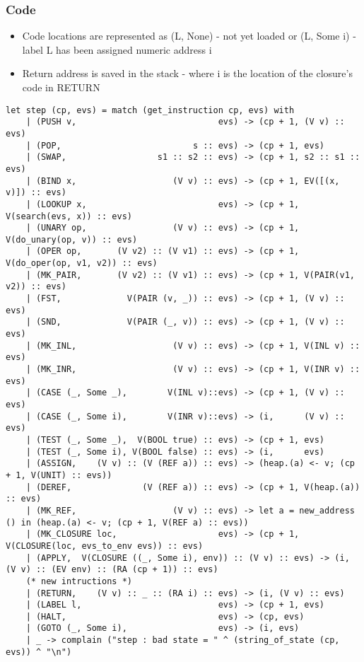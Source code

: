 \documentclass{article}
\begin{document}
\subsubsection{Code}
\begin{itemize}
	\item Code locations are represented as (L, None) - not yet loaded or (L, Some i) - label L has been assigned numeric address i
	\item Return address is saved in the stack - where i is the location of the closure's code in RETURN
\end{itemize}
\begin{lstlisting}
let step (cp, evs) = match (get_instruction cp, evs) with 
	| (PUSH v,                            evs) -> (cp + 1, (V v) :: evs)
	| (POP,                          s :: evs) -> (cp + 1, evs) 
	| (SWAP,                  s1 :: s2 :: evs) -> (cp + 1, s2 :: s1 :: evs) 
	| (BIND x,                   (V v) :: evs) -> (cp + 1, EV([(x, v)]) :: evs) 
	| (LOOKUP x,                          evs) -> (cp + 1, V(search(evs, x)) :: evs)
	| (UNARY op,                 (V v) :: evs) -> (cp + 1, V(do_unary(op, v)) :: evs) 
	| (OPER op,       (V v2) :: (V v1) :: evs) -> (cp + 1, V(do_oper(op, v1, v2)) :: evs)
	| (MK_PAIR,       (V v2) :: (V v1) :: evs) -> (cp + 1, V(PAIR(v1, v2)) :: evs)
	| (FST,             V(PAIR (v, _)) :: evs) -> (cp + 1, (V v) :: evs)
	| (SND,             V(PAIR (_, v)) :: evs) -> (cp + 1, (V v) :: evs)
	| (MK_INL,                   (V v) :: evs) -> (cp + 1, V(INL v) :: evs)
	| (MK_INR,                   (V v) :: evs) -> (cp + 1, V(INR v) :: evs)
	| (CASE (_, Some _),        V(INL v)::evs) -> (cp + 1, (V v) :: evs) 
	| (CASE (_, Some i),        V(INR v)::evs) -> (i,      (V v) :: evs) 
	| (TEST (_, Some _),  V(BOOL true) :: evs) -> (cp + 1, evs) 
	| (TEST (_, Some i), V(BOOL false) :: evs) -> (i,      evs) 
	| (ASSIGN,    (V v) :: (V (REF a)) :: evs) -> (heap.(a) <- v; (cp + 1, V(UNIT) :: evs))
	| (DEREF,              (V (REF a)) :: evs) -> (cp + 1, V(heap.(a)) :: evs)
	| (MK_REF,                   (V v) :: evs) -> let a = new_address () in (heap.(a) <- v; (cp + 1, V(REF a) :: evs))
	| (MK_CLOSURE loc,                    evs) -> (cp + 1, V(CLOSURE(loc, evs_to_env evs)) :: evs)
	| (APPLY,  V(CLOSURE ((_, Some i), env)) :: (V v) :: evs) -> (i, (V v) :: (EV env) :: (RA (cp + 1)) :: evs)
	(* new intructions *) 
	| (RETURN,    (V v) :: _ :: (RA i) :: evs) -> (i, (V v) :: evs) 
	| (LABEL l,                           evs) -> (cp + 1, evs) 
	| (HALT,                              evs) -> (cp, evs) 
	| (GOTO (_, Some i),                  evs) -> (i, evs) 
	| _ -> complain ("step : bad state = " ^ (string_of_state (cp, evs)) ^ "\n")



\end{lstlisting}
\end{document}
